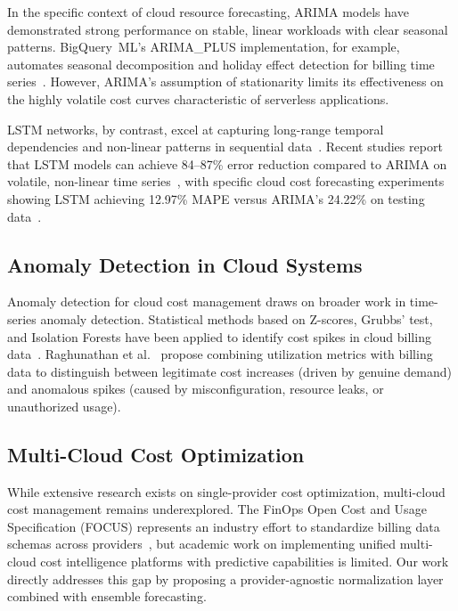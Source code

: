 \documentclass[conference]{IEEEtran}
\begin{document}
In the specific context of cloud resource forecasting, ARIMA models have demonstrated strong performance on stable, linear workloads with clear seasonal patterns. BigQuery~ML's ARIMA\_PLUS implementation, for example, automates seasonal decomposition and holiday effect detection for billing time series~\cite{googlecloud2024}. However, ARIMA's assumption of stationarity limits its effectiveness on the highly volatile cost curves characteristic of serverless applications.

LSTM networks, by contrast, excel at capturing long-range temporal dependencies and non-linear patterns in sequential data~\cite{hochreiter1997}. Recent studies report that LSTM models can achieve 84--87\% error reduction compared to ARIMA on volatile, non-linear time series~\cite{lecun2015}, with specific cloud cost forecasting experiments showing LSTM achieving 12.97\% MAPE versus ARIMA's 24.22\% on testing data~\cite{chollet2021}.

\subsection{Anomaly Detection in Cloud Systems}

Anomaly detection for cloud cost management draws on broader work in time-series anomaly detection. Statistical methods based on Z-scores, Grubbs' test, and Isolation Forests have been applied to identify cost spikes in cloud billing data~\cite{chandola2009}. Raghunathan et al.~\cite{raghunathan2022} propose combining utilization metrics with billing data to distinguish between legitimate cost increases (driven by genuine demand) and anomalous spikes (caused by misconfiguration, resource leaks, or unauthorized usage).

\subsection{Multi-Cloud Cost Optimization}

While extensive research exists on single-provider cost optimization, multi-cloud cost management remains underexplored. The FinOps Open Cost and Usage Specification (FOCUS) represents an industry effort to standardize billing data schemas across providers~\cite{focus2024}, but academic work on implementing unified multi-cloud cost intelligence platforms with predictive capabilities is limited. Our work directly addresses this gap by proposing a provider-agnostic normalization layer combined with ensemble forecasting.
\end{document}
